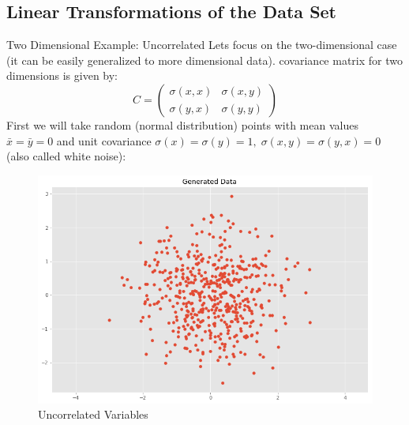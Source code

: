 \documentclass[11pt, usenames, dvipsnames]{beamer}
\begin{document}
\subsection{Linear Transformations of the Data Set}

\begingroup
\footnotesize%
\begin{frame}{Two Dimensional Example: Uncorrelated}
Lets focus on the two-dimensional case (it can be easily generalized to more dimensional data). covariance matrix for two dimensions is given by:
$$C = \left( \begin{array}{ccc}  \sigma(x, x) & \sigma(x, y) \\  \sigma(y, x) & \sigma(y, y) \end{array} \right)$$
\pause
First we will take random (normal distribution) points with mean values $\bar{x}=\bar{y}=0$ and unit covariance $\sigma\left(x\right)=\sigma\left(y\right)=1, \; \sigma\left(x,y\right)=\sigma\left(y,x\right)=0$ (also called white noise):
\pause

\begin{figure}[h!]
  \centering
    \includegraphics[scale=0.2]{uncorrelated.png}  
   \caption{Uncorrelated Variables}
\end{figure}
\end{frame}
\end{document}
